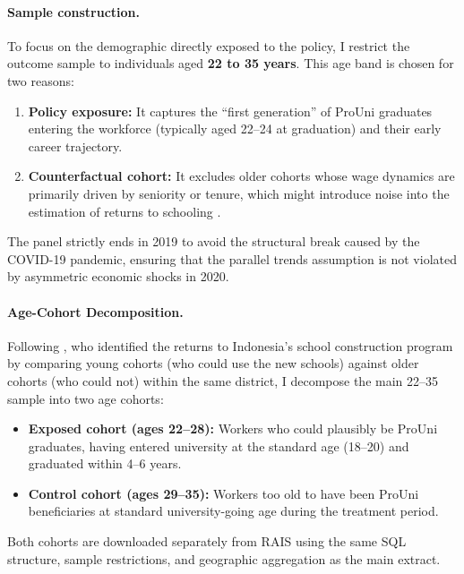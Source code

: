 \paragraph{Sample construction.}
To focus on the demographic directly exposed to the policy, I restrict the outcome sample to individuals aged \textbf{22 to 35 years}. This age band is chosen for two reasons:
\begin{enumerate}
    \item \textbf{Policy exposure:} It captures the ``first generation'' of ProUni graduates entering the workforce (typically aged 22--24 at graduation) and their early career trajectory.
    \item \textbf{Counterfactual cohort:} It excludes older cohorts whose wage dynamics are primarily driven by seniority or tenure, which might introduce noise into the estimation of returns to schooling \cite{Card1999, AngristPischke2009}.
\end{enumerate}
The panel strictly ends in 2019 to avoid the structural break caused by the COVID-19 pandemic, ensuring that the parallel trends assumption is not violated by asymmetric economic shocks in 2020.

\paragraph{Age-Cohort Decomposition.}
Following , who identified the returns to Indonesia's school construction program by comparing young cohorts (who could use the new schools) against older cohorts (who could not) within the same district, I decompose the main 22--35 sample into two age cohorts:
\begin{itemize}
    \item \textbf{Exposed cohort (ages 22--28):} Workers who could plausibly be ProUni graduates, having entered university at the standard age (18--20) and graduated within 4--6 years.
    \item \textbf{Control cohort (ages 29--35):} Workers too old to have been ProUni beneficiaries at standard university-going age during the treatment period.
\end{itemize}
Both cohorts are downloaded separately from RAIS using the same SQL structure, sample restrictions, and geographic aggregation as the main extract.


